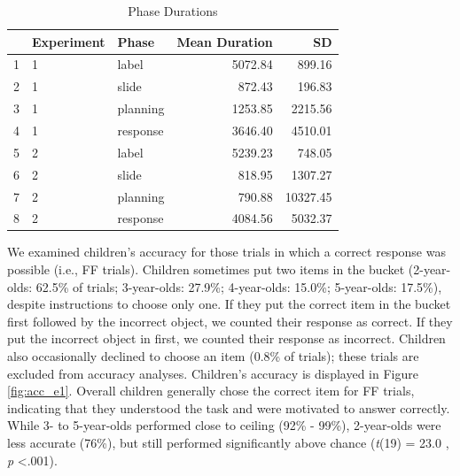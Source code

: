 \documentclass[a4paper,man,apacite,floatsintext]{apa6}
\begin{document}
\begin{table}[b]
\centering
\begin{tabular}{rllrr}
  \hline
 & Experiment & Phase & Mean Duration & SD \\ 
  \hline
1 & 1 & label & 5072.84 & 899.16 \\ 
  2 & 1 & slide & 872.43 & 196.83 \\ 
  3 & 1 & planning & 1253.85 & 2215.56 \\ 
  4 & 1 & response & 3646.40 & 4510.01 \\ 
   \hline
5 & 2 & label & 5239.23 & 748.05 \\ 
  6 & 2 & slide & 818.95 & 1307.27 \\ 
  7 & 2 & planning & 790.88 & 10327.45 \\ 
  8 & 2 & response & 4084.56 & 5032.37 \\ 
   \hline
\end{tabular}
\caption{Phase Durations} 
\label{tab:phases}
\end{table}

We examined children's accuracy for those trials in which a correct
response was possible (i.e., FF trials). Children sometimes put two
items in the bucket (2-year-olds: 62.5\% of trials; 3-year-olds: 27.9\%;
4-year-olds: 15.0\%; 5-year-olds: 17.5\%), despite instructions to
choose only one. If they put the correct item in the bucket first
followed by the incorrect object, we counted their response as correct.
If they put the incorrect object in first, we counted their response as
incorrect. Children also occasionally declined to choose an item (0.8\%
of trials); these trials are excluded from accuracy analyses. Children's
accuracy is displayed in Figure \ref{fig:acc_e1}. Overall children
generally chose the correct item for FF trials, indicating that they
understood the task and were motivated to answer correctly. While 3- to
5-year-olds performed close to ceiling (92\% - 99\%), 2-year-olds were
less accurate (76\%), but still performed significantly above chance
(\emph{t}(19) = 23.0 , \emph{p} \textless{}.001).
\end{document}
